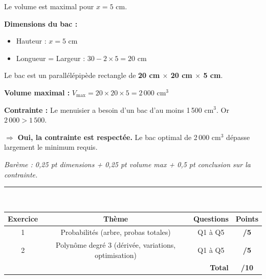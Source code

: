 \documentclass[a4paper,11pt]{article}
\begin{document}
\begin{corrbox}
Le volume est maximal pour $\boxed{x = 5 \text{ cm}}$.

\textbf{Dimensions du bac :}
\begin{itemize}[nosep]
  \item Hauteur : $x = 5$ cm
  \item Longueur = Largeur : $30 - 2 \times 5 = 20$ cm
\end{itemize}

Le bac est un parallélépipède rectangle de \textbf{20 cm $\times$ 20 cm $\times$ 5 cm}.

\textbf{Volume maximal :} $V_{\max} = 20 \times 20 \times 5 = \boxed{2\,000 \text{ cm}^3}$

\textbf{Contrainte :} Le menuisier a besoin d'un bac d'au moins 1\,500 cm$^3$. Or $2\,000 > 1\,500$.

$\Rightarrow$ \textbf{Oui, la contrainte est respectée.} Le bac optimal de 2\,000 cm$^3$ dépasse largement le minimum requis.

\smallskip
\textit{Barème : 0,25 pt dimensions + 0,25 pt volume max + 0,5 pt conclusion sur la contrainte.}
\end{corrbox}

\vfill

\begin{center}
\textcolor{rouge}{\rule{12cm}{1pt}}\\[8pt]
\begin{tabular}{|c|c|c|c|}
\hline
\textbf{Exercice} & \textbf{Thème} & \textbf{Questions} & \textbf{Points} \\
\hline
1 & Probabilités (arbre, probas totales) & Q1 à Q5 & \textbf{/5} \\
\hline
2 & Polynôme degré 3 (dérivée, variations, optimisation) & Q1 à Q5 & \textbf{/5} \\
\hline
\multicolumn{3}{|r|}{\textbf{Total}} & \textbf{/10} \\
\hline
\end{tabular}
\end{center}
\end{document}
